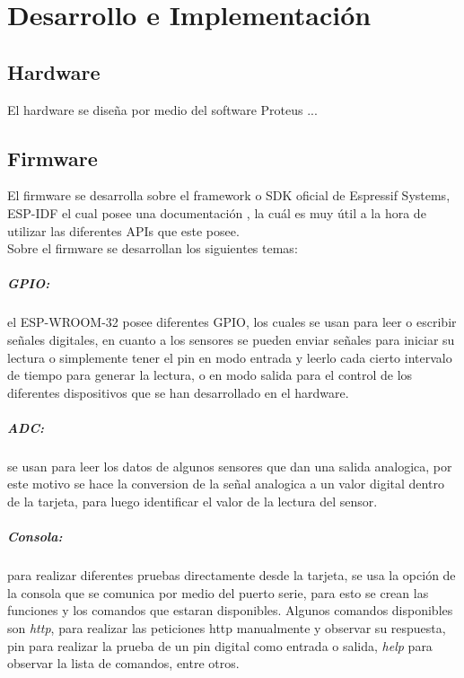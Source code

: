 \chapter{Desarrollo e Implementación}

\section{Hardware}

El hardware se diseña por medio del software Proteus ...

\section{Firmware}

El firmware se desarrolla sobre el framework o SDK oficial de Espressif Systems, ESP-IDF el cual posee una documentación \cite{ES}, la cuál es muy útil a la hora de utilizar las diferentes APIs que este posee.\\

Sobre el firmware se desarrollan los siguientes temas:

\paragraph{GPIO:}

el ESP-WROOM-32 posee diferentes GPIO, los cuales se usan para leer o escribir señales digitales, en cuanto a los sensores se pueden enviar señales para iniciar su lectura o simplemente tener el pin en modo entrada y leerlo cada cierto intervalo de tiempo para generar la lectura, o en modo salida para el control de los diferentes dispositivos que se han desarrollado en el hardware.

\paragraph{ADC:}

se usan para leer los datos de algunos sensores que dan una salida analogica, por este motivo se hace la conversion de la señal analogica a un valor digital dentro de la tarjeta, para luego identificar el valor de la lectura del sensor. 

\paragraph{Consola:}

para realizar diferentes pruebas directamente desde la tarjeta, se usa la opción de la consola que se comunica por medio del puerto serie, para esto se crean las funciones y los comandos que estaran disponibles. Algunos comandos disponibles son \textit{http}, para realizar las peticiones http manualmente y observar su respuesta, pin para realizar la prueba de un pin digital como entrada o salida, \textit{help} para observar la lista de comandos, entre otros.

